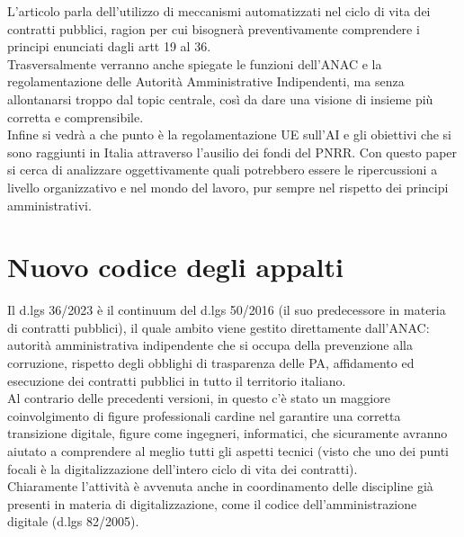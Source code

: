 \documentclass{article}
\begin{document}
\begin{justify}
L'articolo parla dell'utilizzo di meccanismi automatizzati nel ciclo di vita dei contratti pubblici, ragion per cui bisognerà preventivamente comprendere i principi enunciati dagli artt 19 al 36.\\
Trasversalmente verranno anche spiegate le funzioni dell'ANAC e la regolamentazione delle Autorità Amministrative Indipendenti, ma senza allontanarsi troppo dal topic centrale, così da dare una visione di insieme più corretta e comprensibile.\\
Infine si vedrà a che punto è la regolamentazione UE sull'AI e gli obiettivi che si sono raggiunti in Italia attraverso l'ausilio dei fondi del PNRR.
Con questo paper si cerca di analizzare oggettivamente quali potrebbero essere le ripercussioni a livello organizzativo e nel mondo del lavoro, pur sempre nel rispetto dei principi amministrativi.
\end{justify}

\centering
\section{Nuovo codice degli appalti}
\begin{justify}
    Il d.lgs 36/2023 è il continuum del d.lgs 50/2016 (il suo predecessore in materia di contratti pubblici), il quale ambito viene gestito direttamente dall'ANAC: autorità amministrativa indipendente che si occupa della prevenzione alla corruzione, rispetto degli obblighi di trasparenza delle PA, affidamento ed esecuzione dei contratti pubblici in tutto il territorio italiano.\citep{AnacSite}\\
    Al contrario delle precedenti versioni, in questo c'è stato un maggiore coinvolgimento di figure professionali cardine nel garantire una corretta transizione digitale, figure come ingegneri, informatici, che sicuramente avranno aiutato a comprendere al meglio tutti gli aspetti tecnici (visto che uno dei punti focali è la digitalizzazione dell'intero ciclo di vita dei contratti).\\
    Chiaramente l'attività è avvenuta anche in coordinamento delle discipline già presenti in materia di digitalizzazione, come il codice dell'amministrazione digitale (d.lgs 82/2005).
\end{justify}
\end{document}
